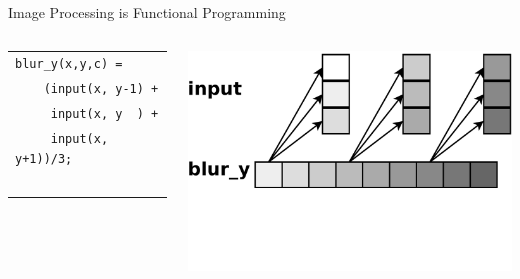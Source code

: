 \documentclass[xcolor=dvipsnames]{beamer}
\begin{document}
\begin{frame}{Image Processing is Functional Programming}
	\begin{columns}

	\begin{tabular}{l}
		\texttt{blur\_y(x,y,c) =} \\
		\texttt{~~~~(input(x, y-1) +}\\
		\texttt{~~~~~input(x, y~~) +}\\
		\texttt{~~~~~input(x, y+1))/3;}\\
		\\
		\\
		\\
		\\
		\\
	\end{tabular}

	\includegraphics[width=\textwidth]{blury.pdf}
	\end{columns}
\end{frame}
\end{document}
